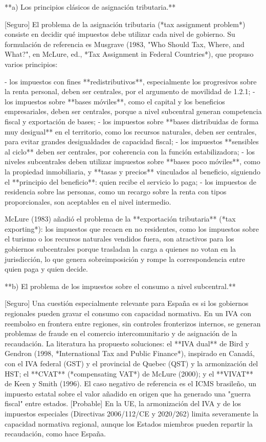 \documentclass[10pt,a4paper]{article}
\begin{document}
**a) Los principios clásicos de asignación tributaria.**

[Seguro] El problema de la asignación tributaria (*tax assignment problem*) consiste en decidir qué impuestos debe utilizar cada nivel de gobierno. Su formulación de referencia es Musgrave (1983, "Who Should Tax, Where, and What?", en McLure, ed., *Tax Assignment in Federal Countries*), que propuso varios principios:

- los impuestos con fines **redistributivos**, especialmente los progresivos sobre la renta personal, deben ser centrales, por el argumento de movilidad de 1.2.1;
- los impuestos sobre **bases móviles**, como el capital y los beneficios empresariales, deben ser centrales, porque a nivel subcentral generan competencia fiscal y exportación de bases;
- los impuestos sobre **bases distribuidas de forma muy desigual** en el territorio, como los recursos naturales, deben ser centrales, para evitar grandes desigualdades de capacidad fiscal;
- los impuestos **sensibles al ciclo** deben ser centrales, por coherencia con la función estabilizadora;
- los niveles subcentrales deben utilizar impuestos sobre **bases poco móviles**, como la propiedad inmobiliaria, y **tasas y precios** vinculados al beneficio, siguiendo el **principio del beneficio**: quien recibe el servicio lo paga;
- los impuestos de residencia sobre las personas, como un recargo sobre la renta con tipos proporcionales, son aceptables en el nivel intermedio.

McLure (1983) añadió el problema de la **exportación tributaria** (*tax exporting*): los impuestos que recaen en no residentes, como los impuestos sobre el turismo o los recursos naturales vendidos fuera, son atractivos para los gobiernos subcentrales porque trasladan la carga a quienes no votan en la jurisdicción, lo que genera sobreimposición y rompe la correspondencia entre quien paga y quien decide.

**b) El problema de los impuestos sobre el consumo a nivel subcentral.**

[Seguro] Una cuestión especialmente relevante para España es si los gobiernos regionales pueden gravar el consumo con capacidad normativa. En un IVA con reembolso en frontera entre regiones, sin controles fronterizos internos, se generan problemas de fraude en el comercio intercomunitario y de asignación de la recaudación. La literatura ha propuesto soluciones: el **IVA dual** de Bird y Gendron (1998, *International Tax and Public Finance*), inspirado en Canadá, con el IVA federal (GST) y el provincial de Quebec (QST) y la armonización del HST; el **CVAT** (*compensating VAT*) de McLure (2000); y el **VIVAT** de Keen y Smith (1996). El caso negativo de referencia es el ICMS brasileño, un impuesto estatal sobre el valor añadido en origen que ha generado una "guerra fiscal" entre estados. [Probable] En la UE, la armonización del IVA y de los impuestos especiales (Directivas 2006/112/CE y 2020/262) limita severamente la capacidad normativa regional, aunque los Estados miembros pueden repartir la recaudación, como hace España.
\end{document}
